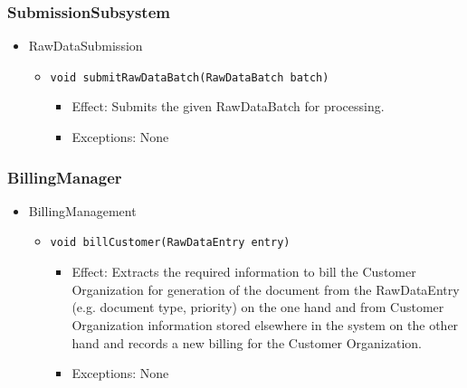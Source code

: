 \documentclass[a4paper,10pt]{article}
\begin{document}
\subsubsection*{SubmissionSubsystem}
\begin{itemize}
	\item RawDataSubmission
	\begin{itemize}
		\item \texttt{void submitRawDataBatch(RawDataBatch batch)}
		\begin{itemize}
			\item Effect: Submits the given RawDataBatch for processing.
			\item Exceptions: None
		\end{itemize}
	\end{itemize}
\end{itemize}

\subsubsection*{BillingManager}
\begin{itemize}
	\item BillingManagement
	\begin{itemize}
		\item \texttt{void billCustomer(RawDataEntry entry)}
		\begin{itemize}
			\item Effect: Extracts the required information to bill the Customer Organization for generation of the document from the RawDataEntry (e.g. document type, priority) on the one hand and from Customer Organization information stored elsewhere in the system on the other hand and records a new billing for the Customer Organization.
			\item Exceptions: None
		\end{itemize}
	\end{itemize}
\end{itemize}
\end{document}
